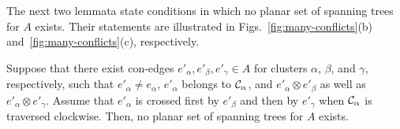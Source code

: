 \documentclass[letter,runningheads]{llncs}
\newcommand{\conf}{\otimes}
\begin{document}
The next two lemmata state conditions in which no planar set of spanning trees for $A$ exists. Their statements are illustrated in Figs.~\ref{fig:many-conflicts}(b) and~\ref{fig:many-conflicts}(c), respectively.

\begin{lemma}[{\sc Test 3}]\label{le:same-order}
Suppose that there exist con-edges $e'_{\alpha}, e'_{\beta}, e'_{\gamma}\in A$ for clusters $\alpha$, $\beta$, and $\gamma$, respectively, such that  $e'_{\alpha}\neq e_{\alpha}$, $e'_{\alpha}$ belongs to ${\cal C}_{\alpha}$, and $e'_{\alpha}\conf e'_{\beta}$ as well as $e'_{\alpha}\conf e'_{\gamma}$. Assume that $e'_{\alpha}$ is crossed first by $e'_{\beta}$ and then by $e'_{\gamma}$ when ${\cal C}_{\alpha}$ is traversed clockwise. Then, no planar set of spanning trees for $A$ exists.
\end{lemma}
\end{document}

